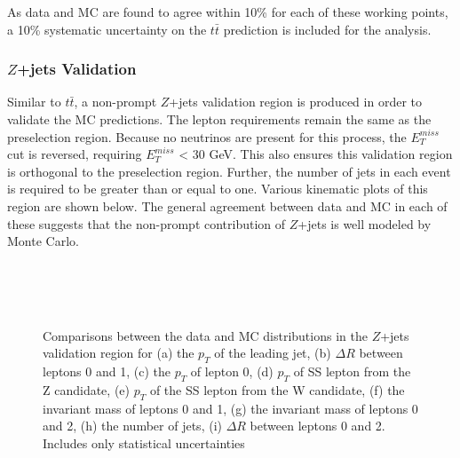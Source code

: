 As data and MC are found to agree within 10\% for each of these working points, a 10\% systematic uncertainty on the $t\bar{t}$ prediction is included for the analysis.

\subsubsection{$Z$+jets Validation}

Similar to $t\bar{t}$, a non-prompt $Z$+jets validation region is produced in order to validate the MC predictions. The lepton requirements remain the same as the preselection region. Because no neutrinos are present for this process, the $E_T^{miss}$ cut is reversed, requiring $E_T^{miss}$ < 30 GeV. This also ensures this validation region is orthogonal to the preselection region. Further, the number of jets in each event is required to be greater than or equal to one. Various kinematic plots of this region are shown below. The general agreement between data and MC in each of these suggests that the non-prompt contribution of $Z$+jets is well modeled by Monte Carlo.

\begin{figure}[H] 
    \\
    \\
    \\
    \caption{Comparisons between the data and MC distributions in the $Z$+jets validation region for (a) the $p_T$ of the leading jet, (b) $\Delta R$ between leptons 0 and 1, (c) the $p_T$ of lepton 0, (d) $p_T$ of SS lepton from the Z candidate, (e) $p_T$ of the SS lepton from the W candidate, (f) the invariant mass of leptons 0 and 1, (g) the invariant mass of leptons 0 and 2, (h) the number of jets, (i) $\Delta R$ between leptons 0 and 2. Includes only statistical uncertainties}%
    \label{fig:zjets_noScale}
\end{figure}

